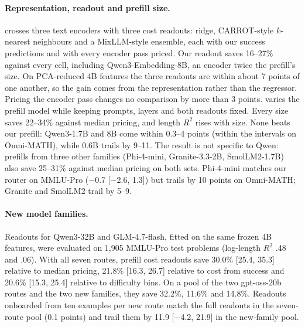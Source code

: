 \documentclass[10pt,twocolumn,letterpaper]{article}
\begin{document}
\paragraph{Representation, readout and prefill size.}
 crosses three text encoders with three cost readouts: ridge, CARROT-style $k$-nearest neighbours and a MixLLM-style ensemble, each with our success predictions and with every encoder pass priced. Our readout saves 16--27\% against every cell, including Qwen3-Embedding-8B, an encoder twice the prefill's size. On PCA-reduced 4B features the three readouts are within about 7 points of one another, so the gain comes from the representation rather than the regressor. Pricing the encoder pass changes no comparison by more than 3 points.  varies the prefill model while keeping prompts, layers and both readouts fixed. Every size saves 22--34\% against median pricing, and length $R^2$ rises with size. None beats our prefill: Qwen3-1.7B and 8B come within 0.3--4 points (within the intervals on Omni-MATH), while 0.6B trails by 9--11.
The result is not specific to Qwen: prefills from three other families (Phi-4-mini, Granite-3.3-2B, SmolLM2-1.7B) also save 25--31\% against median pricing on both sets. Phi-4-mini matches our router on MMLU-Pro ($-$0.7 [$-$2.6, 1.3]) but trails by 10 points on Omni-MATH; Granite and SmolLM2 trail by 5--9.

\paragraph{New model families.}
Readouts for Qwen3-32B and GLM-4.7-flash, fitted on the same frozen 4B features, were evaluated on 1,905 MMLU-Pro test problems (log-length $R^2$ .48 and .06). With all seven routes, prefill cost readouts save 30.0\% [25.4, 35.3] relative to median pricing, 21.8\% [16.3, 26.7] relative to cost from success and 20.6\% [15.3, 25.4] relative to difficulty bins. On a pool of the two gpt-oss-20b routes and the two new families, they save 32.2\%, 11.6\% and 14.8\%. Readouts onboarded from ten examples per new route match the full readouts in the seven-route pool (0.1 points) and trail them by 11.9 [$-$4.2, 21.9] in the new-family pool.
\end{document}
